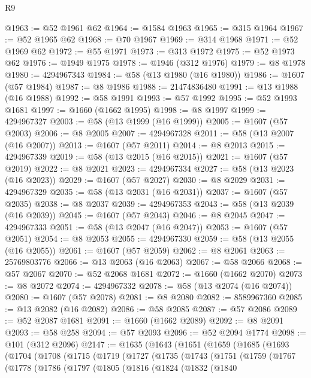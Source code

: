 \begin{lexlean}{R9}
\begin{coremodule}
@1963 := @52 @1961 @62
@1964 := @1584 @1963
@1965 := @315 @1964
@1967 := @52 @1965 @62
@1968 := @70 @1967
@1969 := @314 @1968
@1971 := @52 @1969 @62
@1972 := @55 @1971
@1973 := @313 @1972
@1975 := @52 @1973 @62
@1976 := @1949 @1975
@1978 := @1946 (@312 @1976)
@1979 := @8 @1978
@1980 := 4294967343
@1984 := @58 (@13 @1980 (@16 @1980))
@1986 := @1607 (@57 @1984)
@1987 := @8 @1986
@1988 := 21474836480
@1991 := @13 @1988 (@16 @1988)
@1992 := @58 @1991
@1993 := @57 @1992
@1995 := @52 @1993 @1681
@1997 := @1660 (@1662 @1995)
@1998 := @8 @1997
@1999 := 4294967327
@2003 := @58 (@13 @1999 (@16 @1999))
@2005 := @1607 (@57 @2003)
@2006 := @8 @2005
@2007 := 4294967328
@2011 := @58 (@13 @2007 (@16 @2007))
@2013 := @1607 (@57 @2011)
@2014 := @8 @2013
@2015 := 4294967339
@2019 := @58 (@13 @2015 (@16 @2015))
@2021 := @1607 (@57 @2019)
@2022 := @8 @2021
@2023 := 4294967334
@2027 := @58 (@13 @2023 (@16 @2023))
@2029 := @1607 (@57 @2027)
@2030 := @8 @2029
@2031 := 4294967329
@2035 := @58 (@13 @2031 (@16 @2031))
@2037 := @1607 (@57 @2035)
@2038 := @8 @2037
@2039 := 4294967353
@2043 := @58 (@13 @2039 (@16 @2039))
@2045 := @1607 (@57 @2043)
@2046 := @8 @2045
@2047 := 4294967333
@2051 := @58 (@13 @2047 (@16 @2047))
@2053 := @1607 (@57 @2051)
@2054 := @8 @2053
@2055 := 4294967330
@2059 := @58 (@13 @2055 (@16 @2055))
@2061 := @1607 (@57 @2059)
@2062 := @8 @2061
@2063 := 25769803776
@2066 := @13 @2063 (@16 @2063)
@2067 := @58 @2066
@2068 := @57 @2067
@2070 := @52 @2068 @1681
@2072 := @1660 (@1662 @2070)
@2073 := @8 @2072
@2074 := 4294967332
@2078 := @58 (@13 @2074 (@16 @2074))
@2080 := @1607 (@57 @2078)
@2081 := @8 @2080
@2082 := 8589967360
@2085 := @13 @2082 (@16 @2082)
@2086 := @58 @2085
@2087 := @57 @2086
@2089 := @52 @2087 @1681
@2091 := @1660 (@1662 @2089)
@2092 := @8 @2091
@2093 := @58 @258
@2094 := @57 @2093
@2096 := @52 @2094 @1774
@2098 := @101 (@312 @2096)
@2147 := @1635
    (@1643
      (@1651
        (@1659
          (@1685
            (@1693
              (@1704
                (@1708
                  (@1715
                    (@1719
                      (@1727
                        (@1735
                          (@1743
                            (@1751
                              (@1759
                                (@1767
                                  (@1778
                                    (@1786
                                      (@1797
                                        (@1805
                                          (@1816
                                            (@1824
                                              (@1832
                                                (@1840

\end{coremodule}
\end{lexlean}
